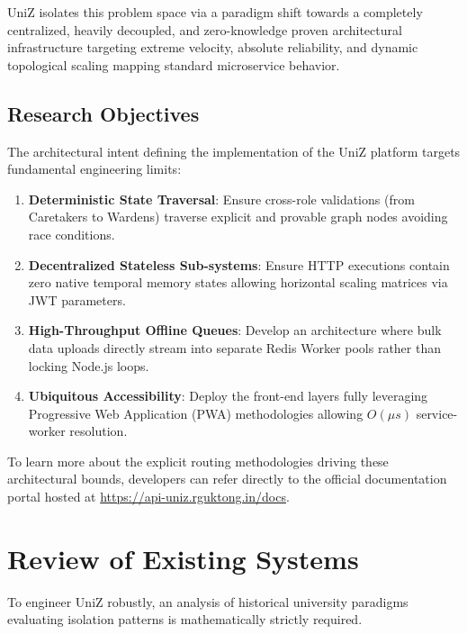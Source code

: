 \documentclass[journal,onecolumn,10pt,draftclsnofoot]{IEEEtran}
\begin{document}
UniZ isolates this problem space via a paradigm shift towards a completely centralized, heavily decoupled, and zero-knowledge proven architectural infrastructure targeting extreme velocity, absolute reliability, and dynamic topological scaling mapping standard microservice behavior.

\subsection{Research Objectives}
The architectural intent defining the implementation of the UniZ platform targets fundamental engineering limits:
\begin{enumerate}
    \item \textbf{Deterministic State Traversal}: Ensure cross-role validations (from Caretakers to Wardens) traverse explicit and provable graph nodes avoiding race conditions.
    \item \textbf{Decentralized Stateless Sub-systems}: Ensure HTTP executions contain zero native temporal memory states allowing horizontal scaling matrices via JWT parameters.
    \item \textbf{High-Throughput Offline Queues}: Develop an architecture where bulk data uploads directly stream into separate Redis Worker pools rather than locking Node.js loops.
    \item \textbf{Ubiquitous Accessibility}: Deploy the front-end layers fully leveraging Progressive Web Application (PWA) methodologies allowing $O(\mu s)$ service-worker resolution.
\end{enumerate}

To learn more about the explicit routing methodologies driving these architectural bounds, developers can refer directly to the official documentation portal hosted at \url{https://api-uniz.rguktong.in/docs}.

\newpage

\section{Review of Existing Systems}

To engineer UniZ robustly, an analysis of historical university paradigms evaluating isolation patterns is mathematically strictly required.
\end{document}
